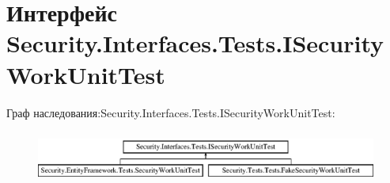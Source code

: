 \hypertarget{interface_security_1_1_interfaces_1_1_tests_1_1_i_security_work_unit_test}{}\section{Интерфейс Security.\+Interfaces.\+Tests.\+I\+Security\+Work\+Unit\+Test}
\label{interface_security_1_1_interfaces_1_1_tests_1_1_i_security_work_unit_test}
Граф наследования\+:Security.\+Interfaces.\+Tests.\+I\+Security\+Work\+Unit\+Test\+:\begin{figure}[H]
\begin{center}
\leavevmode
\includegraphics[height=1.739130cm]{dc/ddf/interface_security_1_1_interfaces_1_1_tests_1_1_i_security_work_unit_test}
\end{center}
\end{figure}

